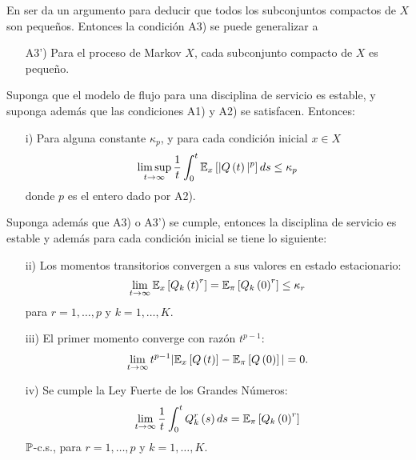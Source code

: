 En \cite{MaynDown} ser da un argumento para deducir que todos los
subconjuntos compactos de $X$ son peque\~nos. Entonces la
condici\'on A3) se puede generalizar a
\begin{itemize}
\item[A3')] Para el proceso de Markov $X$, cada subconjunto
compacto de $X$ es peque\~no.
\end{itemize}

\begin{Teo}\label{Tma2.1}
Suponga que el modelo de flujo para una disciplina de servicio es
estable, y suponga adem\'as que las condiciones A1) y A2) se
satisfacen. Entonces:
\begin{itemize}
\item[i)] Para alguna constante $\kappa_{p}$, y para cada
condici\'on inicial $x\in X$
\begin{equation}
\limsup_{t\rightarrow\infty}\frac{1}{t}\int_{0}^{t}\mathbb{E}_{x}\left[|Q\left(t\right)|^{p}\right]ds\leq\kappa_{p}
\end{equation}
donde $p$ es el entero dado por A2).
\end{itemize}

Suponga adem\'as que A3) o A3')
se cumple, entonces la disciplina de servicio es estable y adem\'as
para cada condici\'on inicial se tiene lo siguiente:
\begin{itemize}

\item[ii)] Los momentos transitorios convergen a sus valores en estado
estacionario:
\begin{equation}
\lim_{t\rightarrow\infty}\mathbb{E}_{x}\left[Q_{k}\left(t\right)^{r}\right]=\mathbb{E}_{\pi}\left[Q_{k}\left(0\right)^{r}\right]\leq\kappa_{r}
\end{equation}
para $r=1,\ldots,p$ y $k=1,\ldots,K$. \item[iii)] El primer
momento converge con raz\'on $t^{p-1}$:
\begin{equation}
\lim_{t\rightarrow\infty}t^{p-1}|\mathbb{E}_{x}\left[Q\left(t\right)\right]-\mathbb{E}_{\pi}\left[Q\left(0\right)\right]|=0.
\end{equation}
\item[iv)] Se cumple la Ley Fuerte de los Grandes N\'umeros:
\begin{equation}
\lim_{t\rightarrow\infty}\frac{1}{t}\int_{0}^{t}Q_{k}^{r}\left(s\right)ds=\mathbb{E}_{\pi}\left[Q_{k}\left(0\right)^{r}\right]
\end{equation}
$\mathbb{P}$-c.s., para $r=1,\ldots,p$ y $k=1,\ldots,K$.
\end{itemize}
\end{Teo}


